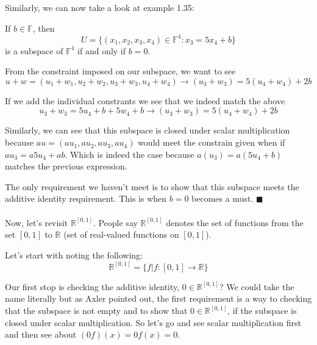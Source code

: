 Similarly, we can now take a look at example 1.35:

If $b\in \mathbb{F}$, then
$$
U = \{ (x_1, x_2, x_3, x_4) \in \mathbb{F}^4 : x_3 = 5x_4 + b \}
$$
is a subspace of $\mathbb{F}^4$ if and only if $b=0$.

From the constraint imposed on our subspace, we want to see
$$
u + w = (u_1+w_1, u_2+w_2, u_3+w_3, u_4+w_4) \rightarrow (u_3+w_3) = 5(u_4+w_4) + 2b
$$

If we add the individual constrants we see that we indeed match the above
$$
u_3 + w_3 = 5u_4 + b + 5w_4 + b \rightarrow (u_3+w_3) = 5(u_4+w_4) + 2b
$$

Similarly, we can see that this subspace is closed under scalar multiplication
because $au = (au_1, au_2, au_3, au_4)$ would meet the constrain given when if
$au_3 = a5u_4 + ab$.
Which is indeed the case because $a(u_3) = a(5u_4 + b)$ matches the previous expression.

The only requirement we haven't meet is to show that this subspace meets the additive identity requirement.
This is when $b=0$ becomes a must.
$\blacksquare$
\\~\\

Now, let's revisit $\mathbb{R}^{[0,1]}$. People say $\mathbb{R}^{[0,1]}$ denotes the set of functions
from the set $[0,1]$ to $\mathbb{R}$ (set of real-valued functions on $[0,1]$).

Let's start with noting the following:
$$
\mathbb{R}^{[0,1]} = \{ f | f : [0,1] \rightarrow \mathbb{R}\}
$$

Our first stop is checking the additive identity, $0\in\mathbb{R}^{[0,1]}$?
We could take the name literally but as Axler pointed out, the first requirement is a way to checking
that the subspace is not empty and to show that $0\in \mathbb{R}^{[0,1]}$, if the subspace is closed
under scalar multiplication.
So let's go and see scalar multiplication first and then see about $(0f)(x) = 0f(x) = 0$.